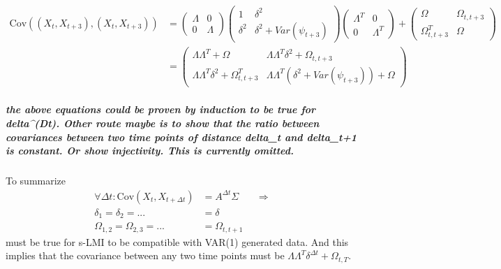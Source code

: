 \documentclass[
  letterpaper,
  DIV=11,
  numbers=noendperiod]{scrartcl}
\let\oldsubparagraph\subparagraph
\renewcommand{\subparagraph}[1]{\oldsubparagraph{#1}\mbox{}}
\begin{document}
\[
\begin{align*}
\text{Cov}((X_{t},X_{t+3}),(X_{t},X_{t+3}))
&= 
\begin{pmatrix}    \Lambda & 0
\\   0 & \Lambda \end{pmatrix}  \begin{pmatrix}   1 & \delta^2 
\\   \delta^2& \delta^2+Var(\psi_{t+3}) \end{pmatrix} \begin{pmatrix}    \Lambda^T & 0
\\   0 & \Lambda^T \end{pmatrix} + \begin{pmatrix}   \Omega & \Omega_{t,t+3} 
\\   \Omega_{t,t+3}^T & \Omega 
\end{pmatrix} 
\\
&=
\begin{pmatrix}    
 \Lambda\Lambda^T + \Omega & \Lambda\Lambda^T\delta^2 + \Omega_{t,t+3} \\   
 \Lambda\Lambda^T\delta^2 + \Omega_{t,t+3}^T & \Lambda\Lambda^T(\delta^2+Var(\psi_{t+3})) + \Omega 
\end{pmatrix} 
\end{align*}
\]

\hypertarget{the-above-equations-could-be-proven-by-induction-to-be-true-for-deltadt.-other-route-maybe-is-to-show-that-the-ratio-between-covariances-between-two-time-points-of-distance-delta_t-and-delta_t1-is-constant.-or-show-injectivity.-this-is-currently-omitted.}{%
\subparagraph{the above equations could be proven by induction to be
true for delta\^{}(Dt). Other route maybe is to show that the ratio
between covariances between two time points of distance delta\_t and
delta\_t+1 is constant. Or show injectivity. This is currently
omitted.}\label{the-above-equations-could-be-proven-by-induction-to-be-true-for-deltadt.-other-route-maybe-is-to-show-that-the-ratio-between-covariances-between-two-time-points-of-distance-delta_t-and-delta_t1-is-constant.-or-show-injectivity.-this-is-currently-omitted.}}

To summarize \[
\begin{align*}
\forall\Delta t:\text{Cov}(X_t,X_{t+\Delta t})&=A^{\Delta t}\Sigma&&\Rightarrow
\\
\delta_1=\delta_2=...&=\delta
\\
\Omega_{1,2}=\Omega_{2,3}=...&=\Omega_{t,t+1}
\end{align*}
\] must be true for s-LMI to be compatible with VAR(1) generated data.
And this implies that the covariance between any two time points must be
\(\Lambda\Lambda^T\delta^{\Delta t} + \Omega_{t,T}\).
\end{document}

